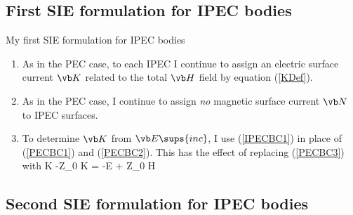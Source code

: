 \documentclass{article}
\begin{document}
\subsection{First SIE formulation for IPEC bodies}

My first SIE formulation for IPEC bodies 
%
\begin{enumerate}
 \item As in the PEC case, to each IPEC I continue to assign an electric
       surface current $\vb K$ related to the total $\vb H$ field
       by equation (\ref{KDef}).
 \item As in the PEC case, I continue to assign \textit{no} magnetic 
       surface current $\vb N$ to IPEC surfaces.
 \item To determine $\vb K$ from $\vb E\sups{inc}$, I use 
        (\ref{IPECBC1}) in place of (\ref{PECBC1}) and (\ref{PECBC2}).
        This has the effect of replacing (\ref{PECBC3}) with
        {
                 \vbGamma{} \star \vb K
      -\zeta Z_0\times \vbGamma{} \star \vb K
                 = -\vb E + \zeta Z_0 \times \vb H
        }
\end{enumerate}

\subsection{Second SIE formulation for IPEC bodies}
\end{document}
